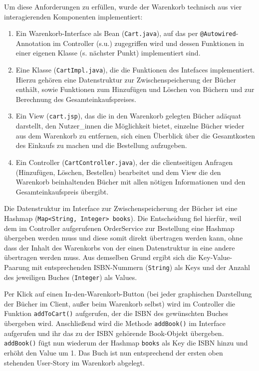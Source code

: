 	Um diese Anforderungen zu erfüllen, wurde der Warenkorb technisch aus vier interagierenden Komponenten implementiert:
	\begin{enumerate}
		\item Ein Warenkorb-Interface als Bean (\lstinline|Cart.java|), auf das per \lstinline|@Autowired|-Annotation im Controller (s.u.) zugegriffen wird und dessen Funktionen in einer eigenen Klasse (s. nächster Punkt) implementiert sind. 
		\item Eine Klasse (\lstinline|CartImpl.java|), die die Funktionen des Intefaces implementiert. Hierzu gehören eine Datenstruktur zur Zwi\-schen\-spei\-che\-rung der Bücher enthält, sowie Funktionen zum Hinzufügen und Lö\-schen von Büchern und zur Berechnung des Gesamteinkaufspreises.
		\item Ein View (\lstinline|cart.jsp|), das die in den Warenkorb gelegten Bücher adäquat darstellt, den Nutzer\_innen die Möglichkeit bietet, einzelne Bücher wieder aus dem Warenkorb zu entfernen, sich einen Überblick über die Gesamtkosten des Einkaufs zu machen und die Bestellung aufzugeben.
		\item Ein Controller (\lstinline|CartController.java|), der die clientseitigen Anfragen (Hinzufügen, Löschen, Bestellen) bearbeitet und dem View die den Warenkorb beinhaltenden Bücher mit allen nötigen Informationen und den Gesamteinkaufspreis übergibt.
	\end{enumerate}

	Die Datenstruktur im Interface zur Zwischenspeicherung der Bücher ist eine Hashmap (\lstinline|Map<String, Integer> books|). Die Entscheidung fiel hierfür, weil dem im Controller aufgerufenen OrderService zur Bestellung eine Hashmap übergeben werden muss und diese somit direkt übertragen werden kann, ohne dass der Inhalt des Warenkorbs von der einen Datenstruktur in eine andere übertragen werden muss. Aus demselben Grund ergibt sich die Key-Value-Paarung mit entsprechenden ISBN-Nummern (\lstinline|String|) als Keys und der Anzahl des jeweiligen Buches (\lstinline|Integer|) als Values. 
	 
	Per Klick auf einen In-den-Warenkorb-Button (bei jeder graphischen Darstellung der Bü\-cher im Client, außer beim Warenkorb selbst) wird im Controller die Funktion \lstinline|addToCart()| aufgerufen, der die ISBN des gewünschten Buches übergeben wird. Anschließend wird die Methode \lstinline|addBook()| im Interface aufgerufen und ihr das zu der ISBN gehörende Book-Objekt übergeben. \lstinline|addBook()| fügt nun wiederum der Hashmap \lstinline|books| als Key die ISBN hinzu und  erhöht den Value um 1. Das Buch ist nun entsprechend der ersten oben stehenden User-Story im Warenkorb abgelegt.
	
